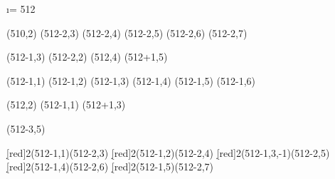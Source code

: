 \begin{sseqdata}[ name = theta8ASS, xscale=1.0, yscale=1.0, x range = {507}{512}, y range = {0}{5}, x tick step = 2, y tick step = 2, class labels = {left}, classes = fill, grid = crossword, Adams grading, lax degree]
  \i = 512
  
  \class["h_8^2"](510,2)
  \class(512-2,3) \structline
  \class(512-2,4) \structline
  \class(512-2,5) \structline
  \class(512-2,6) \structline
  \class(512-2,7) \structline

  \class(512-1,3) \structline(512-2,2)
  \class(512,4) \structline
  \class(512+1,5) \structline 
  
  \class["h_{9}"](512-1,1)
  \class(512-1,2) \structline
  \class(512-1,3) \structline
  \class(512-1,4) \structline
  \class(512-1,5) \structline
  \class(512-1,6) \structline

  \class(512,2) \structline(512-1,1)
  \class(512+1,3) \structline

  \class["V_1'" below](512-3,5)

  \d[red]2(512-1,1)(512-2,3)
  \d[red]2(512-1,2)(512-2,4)
  \d[red]2(512-1,3,-1)(512-2,5)
  \d[red]2(512-1,4)(512-2,6)
  \d[red]2(512-1,5)(512-2,7)
  
\end{sseqdata}

